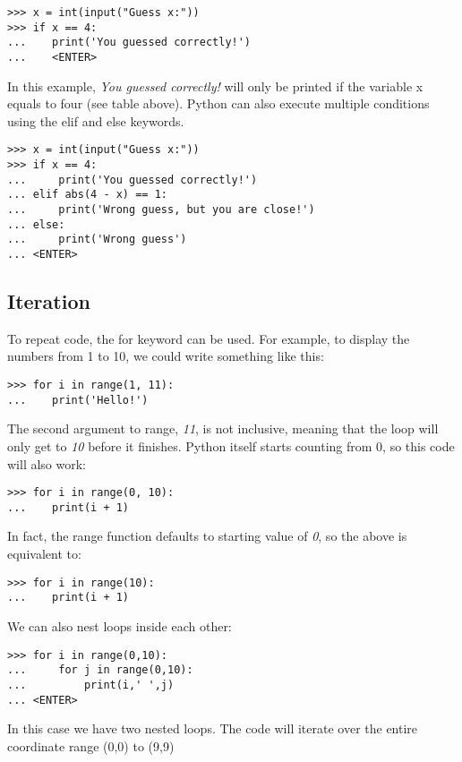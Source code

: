 \begin{verbatim}
>>> x = int(input("Guess x:"))
>>> if x == 4:
...    print('You guessed correctly!')
...    <ENTER>
\end{verbatim}

In this example, \emph{You guessed correctly!} will only be printed if
the variable x equals to four (see table above). Python can also execute
multiple conditions using the elif and else keywords.

\begin{verbatim}
>>> x = int(input("Guess x:"))
>>> if x == 4:
...     print('You guessed correctly!')
... elif abs(4 - x) == 1:
...     print('Wrong guess, but you are close!')
... else:
...     print('Wrong guess')
... <ENTER>
\end{verbatim}

\subsection{Iteration}\label{iteration}

To repeat code, the for keyword can be used. For example, to display the
numbers from 1 to 10, we could write something like this:

\begin{verbatim}
>>> for i in range(1, 11):
...    print('Hello!')
\end{verbatim}

The second argument to range, \emph{11}, is not inclusive, meaning that
the loop will only get to \emph{10} before it finishes. Python itself
starts counting from 0, so this code will also work:

\begin{verbatim}
>>> for i in range(0, 10):
...    print(i + 1)
\end{verbatim}

In fact, the range function defaults to starting value of \emph{0}, so
the above is equivalent to:

\begin{verbatim}
>>> for i in range(10):
...    print(i + 1)
\end{verbatim}

We can also nest loops inside each other:

\begin{verbatim}
>>> for i in range(0,10):
...     for j in range(0,10):
...         print(i,' ',j)
... <ENTER>
\end{verbatim}

In this case we have two nested loops. The code will iterate over the
entire coordinate range (0,0) to (9,9)


